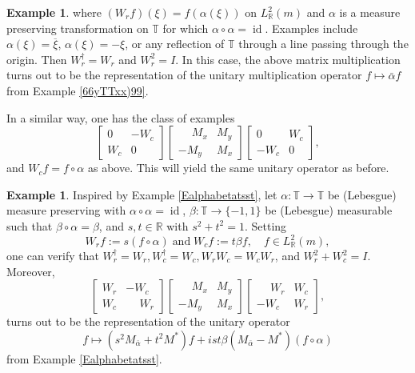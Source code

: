 \documentclass{dis}
\theoremstyle{plain}
\theoremstyle{definition}
\newtheorem{Example}[equation]{Example}
\def\R{\mathbb{R}}
\def\T{\mathbb{T}}
\newcommand{\0}{{\color{lightgray}0}}
\begin{document}
\begin{Example}
where $(W_{r} f)(\xi) = f(\alpha(\xi))$ on $L^2_{\R}(m)$ and $\alpha$ is a measure preserving transformation on $\T$ for which $\alpha \circ \alpha = \operatorname{id}$. Examples include $\alpha(\xi) = \overline{\xi}$, $\alpha(\xi) = - \xi$, or any reflection of $\T$ through a line passing through the origin. Then $W_{r}^{\dagger} = W_{r}$ and $W_{r}^{2} = I$.  In this case, the above matrix multiplication turns out to be the representation of the unitary multiplication operator
 $f \mapsto  \bar \alpha f$ from Example \ref{66yTTxx)99}. 

 In a similar way, one has the class of examples
$$ \begin{bmatrix} 0 & -W_{c}\\ W_{c} & 0\end{bmatrix}  \begin{bmatrix} \phantom{-}M_{x} &  M_{y}\\ - M_{y} & M_{x}\end{bmatrix}  \begin{bmatrix} 0 & W_{c}\\ -W_{c} & 0\end{bmatrix},$$
and $W_c f = f \circ \alpha$ as above. This will yield the same unitary operator as before.
\end{Example}


\begin{Example}
Inspired by Example \ref{Ealphabetatsst},  let $\alpha: \T \to \T$ be (Lebesgue) measure preserving with $\alpha \circ \alpha = \operatorname{id}$, $\beta: \T \to \{-1, 1\}$  be (Lebesgue) measurable such that $\beta \circ \alpha = \beta$, and $s, t \in \R$ with $s^2 + t^2 = 1$. Setting 
$$W_{r} f := s (f \circ \alpha) \; \mbox{and} \; W_{c} f := t \beta f, \quad f \in L^2_{\R}(m),$$
one can verify that $W_{r}^{\dagger} = W_{r}, W_{c}^{\dagger} = W_c, W_{r} W_{c} = W_{c} W_{r}$, and $W_{r}^{2} + W_{c}^{2} = I$. Moreover, 
$$ \begin{bmatrix} W_{r} & -W_{c}\\ W_{c} & \phantom{-}W_{r}\end{bmatrix}  \begin{bmatrix} \phantom{-}M_{x} &  M_{y}\\ - M_{y} & M_{x}\end{bmatrix}  \begin{bmatrix} \phantom{-}W_{r} & W_{c}\\ -W_{c} & W_{r}\end{bmatrix},$$
 turns out to be the representation of 
the unitary operator 
$$ f \mapsto (s^2 M_{\bar \alpha} + t^2 M^{*}) f + i s t \beta (M_{\bar \alpha} - M^{*}) (f \circ \alpha)$$
from 
 Example \ref{Ealphabetatsst}.
\end{Example} 
\end{document}
